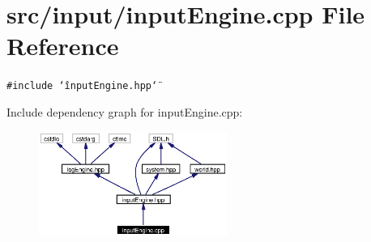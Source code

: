\section{src/input/input\-Engine.cpp File Reference}
\label{inputEngine_8cpp}
{\tt \#include \char`\"{}input\-Engine.hpp\char`\"{}}\par


Include dependency graph for input\-Engine.cpp:\begin{figure}[H]
\begin{center}
\leavevmode
\includegraphics[width=174pt]{inputEngine_8cpp__incl}
\end{center}
\end{figure}
